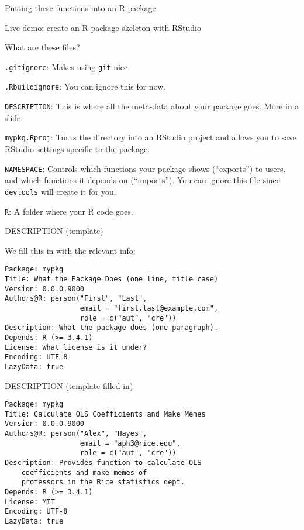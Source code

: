 \documentclass[12pt,ignorenonframetext,compress]{beamer}
\begin{document}
\begin{frame}{Putting these functions into an R package}

Live demo: create an R package skeleton with RStudio

\end{frame}

\begin{frame}[fragile]{What are these files?}

\texttt{.gitignore}: Makes using \texttt{git} nice.

\texttt{.Rbuildignore}: You can ignore this for now.

\texttt{DESCRIPTION}: This is where all the meta-data about your package
goes. More in a slide.

\texttt{mypkg.Rproj}: Turns the directory into an RStudio project and
allows you to save RStudio settings specific to the package.

\texttt{NAMESPACE}: Controls which functions your package shows
(``exports'') to users, and which functions it depends on (``imports'').
You can ignore this file since \texttt{devtools} will create it for you.

\texttt{R}: A folder where your R code goes.

\end{frame}

\begin{frame}[fragile]{DESCRIPTION (template)}

We fill this in with the relevant info:

\begin{verbatim}
Package: mypkg
Title: What the Package Does (one line, title case)
Version: 0.0.0.9000
Authors@R: person("First", "Last",
                  email = "first.last@example.com",
                  role = c("aut", "cre"))
Description: What the package does (one paragraph).
Depends: R (>= 3.4.1)
License: What license is it under?
Encoding: UTF-8
LazyData: true
\end{verbatim}

\end{frame}

\begin{frame}[fragile]{DESCRIPTION (template filled in)}

\begin{verbatim}
Package: mypkg
Title: Calculate OLS Coefficients and Make Memes
Version: 0.0.0.9000
Authors@R: person("Alex", "Hayes",
                  email = "aph3@rice.edu",
                  role = c("aut", "cre"))
Description: Provides function to calculate OLS
    coefficients and make memes of
    professors in the Rice statistics dept.
Depends: R (>= 3.4.1)
License: MIT
Encoding: UTF-8
LazyData: true
\end{verbatim}

\end{frame}
\end{document}
